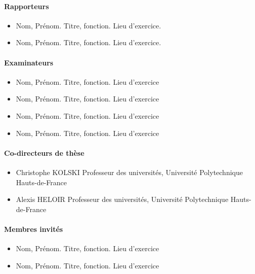 \documentclass[a4paper,12pt]{article}
\begin{document}
\begin{titlepage}
\begin{multicols}{2}
\paragraph*{Rapporteurs}
\label{sec:orge8203eb}
\begin{itemize}
\item Nom, Prénom. Titre, fonction. Lieu d'exercice.
\item Nom, Prénom. Titre, fonction. Lieu d'exercice.
\vspace*{-12pt}
\end{itemize}
\paragraph*{Examinateurs}
\label{sec:org3ca6270}
\begin{itemize}
\item Nom, Prénom. Titre, fonction. Lieu d'exercice
\item Nom, Prénom. Titre, fonction. Lieu d'exercice
\item Nom, Prénom. Titre, fonction. Lieu d'exercice
\item Nom, Prénom. Titre, fonction. Lieu d'exercice
\vspace*{-12pt}
\end{itemize}
\paragraph*{Co-directeurs de thèse}
\label{sec:org1be4e9f}
\begin{itemize}
\item Christophe KOLSKI Professeur des universités, Université Polytechnique Hauts-de-France
\item Alexis HELOIR Professeur des universités, Université Polytechnique Hauts-de-France
\vspace*{-12pt}
\end{itemize}
\paragraph*{Membres invités}
\label{sec:org819712c}
\begin{itemize}
\item Nom, Prénom. Titre, fonction. Lieu d'exercice
\item Nom, Prénom. Titre, fonction. Lieu d'exercice
\end{itemize}

\end{multicols}
\end{titlepage}
\clearpage
\end{document}
